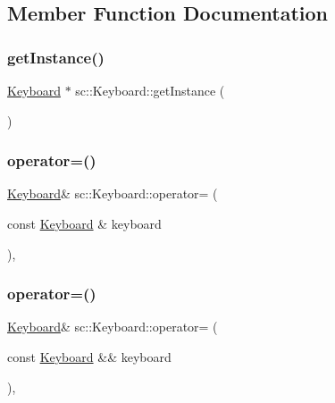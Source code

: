 \subsection{Member Function Documentation}
\mbox{\label{classsc_1_1_keyboard_ae1c7c6d408d7c26a48ba96ed2f114c6a}} 
\subsubsection{\texorpdfstring{getInstance()}{getInstance()}}
{\footnotesize\ttfamily \mbox{\hyperlink{classsc_1_1_keyboard}{Keyboard}} $\ast$ sc\+::\+Keyboard\+::get\+Instance (\begin{DoxyParamCaption}{ }\end{DoxyParamCaption})\hspace{0.3cm}{\ttfamily [static]}}

\mbox{\label{classsc_1_1_keyboard_ae1cb1f0536b084bdde85c610b14396ef}} 
\subsubsection{\texorpdfstring{operator=()}{operator=()}\hspace{0.1cm}{\footnotesize\ttfamily [1/2]}}
{\footnotesize\ttfamily \mbox{\hyperlink{classsc_1_1_keyboard}{Keyboard}}\& sc\+::\+Keyboard\+::operator= (\begin{DoxyParamCaption}\item[{const \mbox{\hyperlink{classsc_1_1_keyboard}{Keyboard}} \&}]{keyboard }\end{DoxyParamCaption})\hspace{0.3cm}{\ttfamily [private]}, {\ttfamily [delete]}}

\mbox{\label{classsc_1_1_keyboard_ab44b7b158694126e44b3576eb97b428f}} 
\subsubsection{\texorpdfstring{operator=()}{operator=()}\hspace{0.1cm}{\footnotesize\ttfamily [2/2]}}
{\footnotesize\ttfamily \mbox{\hyperlink{classsc_1_1_keyboard}{Keyboard}}\& sc\+::\+Keyboard\+::operator= (\begin{DoxyParamCaption}\item[{const \mbox{\hyperlink{classsc_1_1_keyboard}{Keyboard}} \&\&}]{keyboard }\end{DoxyParamCaption})\hspace{0.3cm}{\ttfamily [private]}, {\ttfamily [delete]}}



